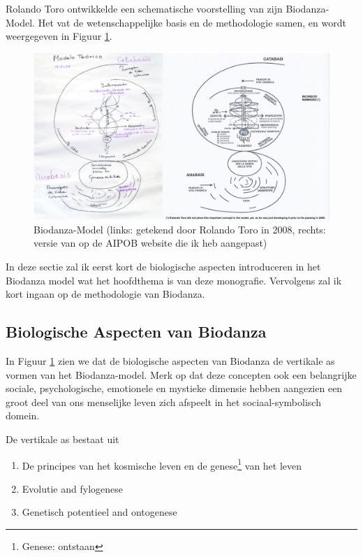 \documentclass[
  11pt,
]{book}
\providecommand{\tightlist}{%
  \setlength{\itemsep}{0pt}\setlength{\parskip}{0pt}}
\begin{document}
Rolando Toro ontwikkelde een schematische voorstelling van zijn Biodanza-Model. Het vat de wetenschappelijke basis en de methodologie samen, en wordt weergegeven in Figuur \ref{fig:model}.

\begin{figure}

{\centering \includegraphics[width=1\linewidth]{./figs/biodanzamodel2andRolando} 

}

\caption{Biodanza-Model (links: getekend door Rolando Toro in 2008, rechts: versie van op de AIPOB website die ik heb aangepast)}\label{fig:model}
\end{figure}

In deze sectie zal ik eerst kort de biologische aspecten introduceren in het Biodanza model wat het hoofdthema is van deze monografie. Vervolgens zal ik kort ingaan op de methodologie van Biodanza.

\hypertarget{biologische-aspecten-van-biodanza}{%
\subsection{Biologische Aspecten van Biodanza}\label{biologische-aspecten-van-biodanza}}

In Figuur \ref{fig:model} zien we dat de biologische aspecten van Biodanza de vertikale as vormen van het Biodanza-model. Merk op dat deze concepten ook een belangrijke sociale, psychologische, emotionele en mystieke dimensie hebben aangezien een groot deel van ons menselijke leven zich afspeelt in het sociaal-symbolisch domein.

De vertikale as bestaat uit

\begin{enumerate}
\def\labelenumi{\arabic{enumi}.}
\tightlist
\item
  De principes van het kosmische leven en de genese\footnote{Genese: ontstaan} van het leven
\item
  Evolutie and fylogenese
\item
  Genetisch potentieel and ontogenese
\end{enumerate}
\end{document}
